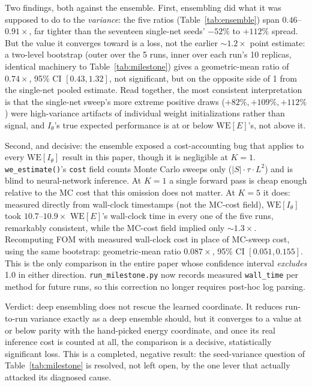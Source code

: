 \documentclass[a4paper,fleqn]{cas-sc}
\begin{document}
Two findings, both against the ensemble. First, ensembling did what it was
supposed to do to the \emph{variance}: the five ratios (Table~\ref{tab:ensemble}) span
$0.46$--$0.91\times$, far tighter than the seventeen single-net seeds' $-52\%$ to
$+112\%$ spread. But the value it converges toward is a loss, not the earlier
$\sim\!1.2\times$ point estimate: a two-level bootstrap (outer over the 5 runs, inner over
each run's 10 replicas, identical machinery to Table~\ref{tab:milestone}) gives a
geometric-mean ratio of $0.74\times$, 95\% CI $[0.43, 1.32]$, not significant, but on the
opposite side of 1 from the single-net pooled estimate. Read together, the most consistent
interpretation is that the single-net sweep's more extreme positive draws ($+82\%,
+109\%, +112\%$) were high-variance artifacts of individual weight initializations rather
than signal, and $I_\theta$'s true expected performance is at or below
$\mathrm{WE}[E]$'s, not above it.

Second, and decisive: the ensemble exposed a cost-accounting bug that applies to
	every $\mathrm{WE}[I_\theta]$ result in this paper, though it is negligible at
	$K=1$. \texttt{we\_estimate()}'s \texttt{cost} field counts Monte Carlo sweeps only
($|S|\cdot\tau\cdot L^2$) and is blind to neural-network inference. At $K=1$ a single
forward pass is cheap enough relative to the MC cost that this omission does not matter.
At $K=5$ it does: measured directly from wall-clock timestamps (not the MC-cost field),
$\mathrm{WE}[I_\theta]$ took $10.7$--$10.9\times$ $\mathrm{WE}[E]$'s wall-clock time in
every one of the five runs, remarkably consistent, while the MC-cost field implied
only $\sim\!1.3\times$. Recomputing FOM with measured wall-clock cost in place of MC-sweep
cost, using the same bootstrap: geometric-mean ratio $0.087\times$, 95\% CI $[0.051,
0.155]$. This is the only comparison in the entire paper whose confidence interval
\emph{excludes} 1.0 in either direction. \texttt{run\_milestone.py} now records
measured \texttt{wall\_time} per method for future runs, so this correction no longer
requires post-hoc log parsing.

Verdict: deep ensembling does not rescue the learned coordinate. It reduces
run-to-run variance exactly as a deep ensemble should, but it converges to a value at or
below parity with the hand-picked energy coordinate, and once its real inference cost is
counted at all, the comparison is a decisive, statistically significant loss. This is a
completed, negative result: the seed-variance question of Table~\ref{tab:milestone} is
resolved, not left open, by the one lever that actually attacked its diagnosed cause.
\end{document}
